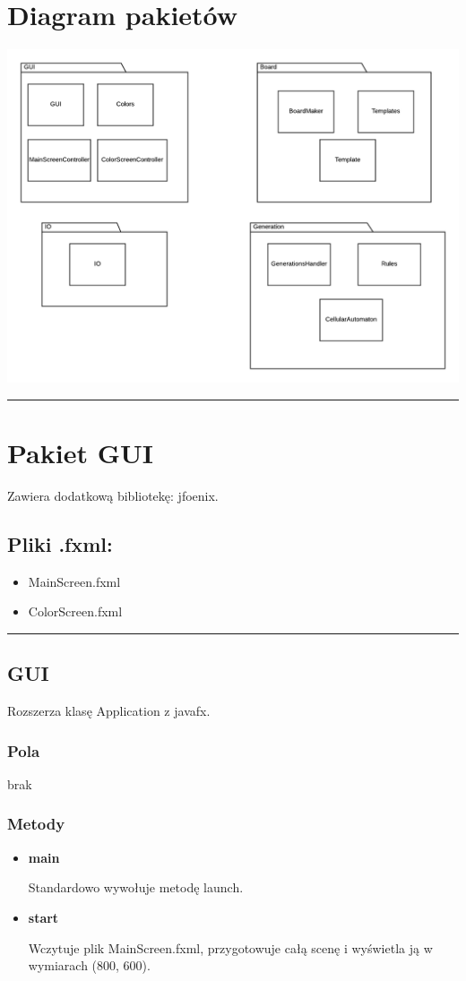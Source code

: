 \documentclass[a4paper,11pt]{article}
\newcommand{\linia}{\rule{\linewidth}{0.4mm}}
\begin{document}
\section{Diagram pakietów}
\includegraphics[width=\textwidth]{DiagramPakiet}







\noindent\linia
\section{Pakiet GUI}

Zawiera dodatkową bibliotekę: jfoenix.

\subsection{Pliki .fxml:}
\begin{itemize}
\item MainScreen.fxml
\item ColorScreen.fxml
\end{itemize}
\noindent\linia

\subsection{GUI}
Rozszerza klasę Application z javafx.
\subsubsection{Pola}
brak
\subsubsection{Metody}
\begin{itemize}
\item \textbf{main}

Standardowo wywołuje metodę launch.
\item \textbf{start}

Wczytuje plik MainScreen.fxml, przygotowuje całą scenę i wyświetla ją w wymiarach (800, 600).
\end{itemize}
\end{document}
